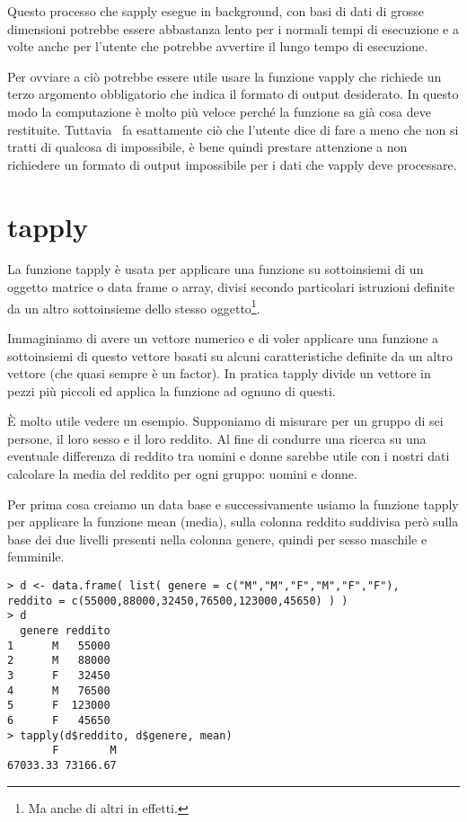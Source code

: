Questo processo che \textsf{sapply} esegue in background, con basi di dati di grosse dimensioni potrebbe essere abbastanza lento per i normali tempi di esecuzione e a volte anche per l'utente che potrebbe avvertire il lungo tempo di esecuzione.

Per ovviare a ciò potrebbe essere utile usare la funzione \textsf{vapply} che richiede un terzo argomento obbligatorio che indica il formato di output desiderato. In questo modo la computazione è molto più veloce perché la funzione sa già cosa deve restituite. Tuttavia \erre\ fa esattamente ciò che l'utente dice di fare a meno che non si tratti di qualcosa di impossibile, è bene quindi prestare attenzione a non richiedere un formato di output impossibile per i dati che \textsf{vapply} deve processare.

\section{tapply}
La funzione \textsf{tapply} è usata per applicare una funzione su sottoinsiemi di un oggetto matrice o data frame o array, divisi secondo particolari istruzioni definite da un altro sottoinsieme dello stesso oggetto\footnote{Ma anche di altri in effetti.}. 

Immaginiamo di avere un vettore numerico e di voler applicare una funzione a sottoinsiemi di questo vettore basati su alcuni caratteristiche definite da un altro vettore (che quasi sempre è un factor). In pratica \textsf{tapply} divide un vettore in pezzi più piccoli ed applica la funzione ad ognuno di questi.

È molto utile vedere un esempio. Supponiamo di misurare per un gruppo di sei persone, il loro sesso e il loro reddito. Al fine di condurre una ricerca su una eventuale differenza di reddito tra uomini e donne sarebbe utile con i nostri dati calcolare la media del reddito per ogni gruppo: uomini e donne.

Per prima cosa creiamo un data base e successivamente usiamo la funzione
\textsf{tapply} per applicare la funzione \textsf{mean} (media), sulla colonna reddito suddivisa però sulla base dei due livelli presenti nella colonna genere, quindi per sesso maschile e femminile.

\begin{lstlisting}
> d <- data.frame( list( genere = c("M","M","F","M","F","F"), 
reddito = c(55000,88000,32450,76500,123000,45650) ) )
> d
  genere reddito
1      M   55000
2      M   88000
3      F   32450
4      M   76500
5      F  123000
6      F   45650
> tapply(d$reddito, d$genere, mean)
       F        M 
67033.33 73166.67
\end{lstlisting}

